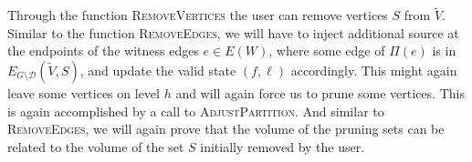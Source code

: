 \documentclass[11pt]{article}
\newcommand\bell{\boldsymbol{\mathit{\ell}}}
\newcommand\ff{\boldsymbol{\mathit{f}}}
\begin{document}
Through the function \textsc{RemoveVertices} the user can remove vertices $S$ from $\tilde{V}$. Similar to the function \textsc{RemoveEdges}, we will have to inject additional source at the endpoints of the witness edges $e \in E(W)$, where some edge of $\Pi(e)$ is in $E_{G \setminus \mathcal{D}}(\tilde{V},S)$, and update the valid state $(\ff, \bell)$ accordingly. This might again leave some vertices on level $h$ and will again force us to prune some vertices. This is again accomplished by a call to \textsc{AdjustPartition}. And similar to \textsc{RemoveEdges}, we will again prove that the volume of the pruning sets can be related to the volume of the set $S$ initially removed by the user.

\begin{comment}
\begin{algorithm}[H]
\caption{$\textsc{PruneOrCertify}(G, \ell)$}\label{alg:PruneOrCertify}
\begin{algorithmic}[1]
\State $S \leftarrow \emptyset, i \leftarrow h$ 
\Repeat 
\State $S \leftarrow S \cup\left\{v \in \tilde{V} \mid \bell(v) = i\right\}$
\State $i \leftarrow i - 1$
\Until{$\operatorname{vol}_{G}\left(\{v \in \tilde{V} \mid \bell(v) \leq i\}\right) < (1 + \phi) \cdot \operatorname{vol}_{G}(S)$} 
\State \Return the cut $S$ 
\end{algorithmic}
\end{algorithm}
\end{comment}
\end{document}
